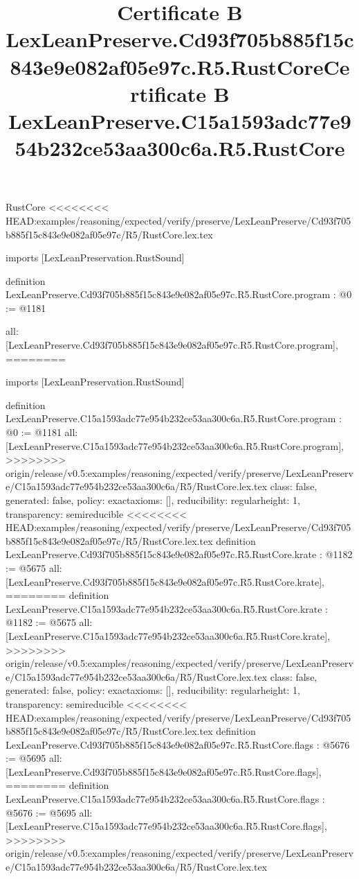 \begin{lexlean}{RustCore}
<<<<<<<< HEAD:examples/reasoning/expected/verify/preserve/LexLeanPreserve/Cd93f705b885f15c843e9e082af05e97c/R5/RustCore.lex.tex
\title{Certificate B LexLeanPreserve.Cd93f705b885f15c843e9e082af05e97c.R5.RustCore}
\begin{coremodule}
imports [LexLeanPreservation.RustSound]

definition LexLeanPreserve.Cd93f705b885f15c843e9e082af05e97c.R5.RustCore.program : @0 := @1181 {
  all: [LexLeanPreserve.Cd93f705b885f15c843e9e082af05e97c.R5.RustCore.program],
========
\title{Certificate B LexLeanPreserve.C15a1593adc77e954b232ce53aa300c6a.R5.RustCore}
\begin{coremodule}
imports [LexLeanPreservation.RustSound]

definition LexLeanPreserve.C15a1593adc77e954b232ce53aa300c6a.R5.RustCore.program : @0 := @1181 {
  all: [LexLeanPreserve.C15a1593adc77e954b232ce53aa300c6a.R5.RustCore.program],
>>>>>>>> origin/release/v0.5:examples/reasoning/expected/verify/preserve/LexLeanPreserve/C15a1593adc77e954b232ce53aa300c6a/R5/RustCore.lex.tex
  class: false,
  generated: false,
  policy: exact{axioms: []},
  reducibility: regular{height: 1},
  transparency: semireducible
}
<<<<<<<< HEAD:examples/reasoning/expected/verify/preserve/LexLeanPreserve/Cd93f705b885f15c843e9e082af05e97c/R5/RustCore.lex.tex
definition LexLeanPreserve.Cd93f705b885f15c843e9e082af05e97c.R5.RustCore.krate : @1182 := @5675 {
  all: [LexLeanPreserve.Cd93f705b885f15c843e9e082af05e97c.R5.RustCore.krate],
========
definition LexLeanPreserve.C15a1593adc77e954b232ce53aa300c6a.R5.RustCore.krate : @1182 := @5675 {
  all: [LexLeanPreserve.C15a1593adc77e954b232ce53aa300c6a.R5.RustCore.krate],
>>>>>>>> origin/release/v0.5:examples/reasoning/expected/verify/preserve/LexLeanPreserve/C15a1593adc77e954b232ce53aa300c6a/R5/RustCore.lex.tex
  class: false,
  generated: false,
  policy: exact{axioms: []},
  reducibility: regular{height: 1},
  transparency: semireducible
}
<<<<<<<< HEAD:examples/reasoning/expected/verify/preserve/LexLeanPreserve/Cd93f705b885f15c843e9e082af05e97c/R5/RustCore.lex.tex
definition LexLeanPreserve.Cd93f705b885f15c843e9e082af05e97c.R5.RustCore.flags : @5676 := @5695 {
  all: [LexLeanPreserve.Cd93f705b885f15c843e9e082af05e97c.R5.RustCore.flags],
========
definition LexLeanPreserve.C15a1593adc77e954b232ce53aa300c6a.R5.RustCore.flags : @5676 := @5695 {
  all: [LexLeanPreserve.C15a1593adc77e954b232ce53aa300c6a.R5.RustCore.flags],
>>>>>>>> origin/release/v0.5:examples/reasoning/expected/verify/preserve/LexLeanPreserve/C15a1593adc77e954b232ce53aa300c6a/R5/RustCore.lex.tex
}}}
\end{coremodule}}
\end{coremodule}
\end{lexlean}
